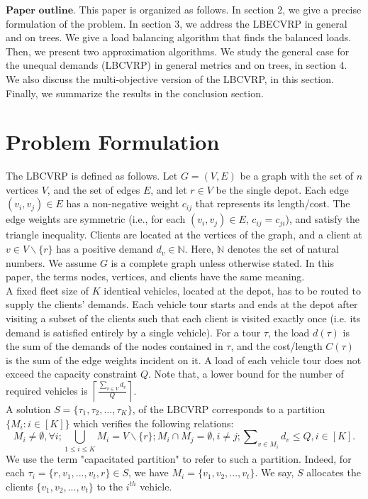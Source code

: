 \indent $\mathbf{Paper\,\,outline}.$ This paper is organized as follows. In section 2, we give a precise formulation of the problem. In section 3, we address the LBECVRP in general and on trees. We give a load balancing algorithm that finds the balanced loads. Then, we present two approximation algorithms. We study the general case for the unequal demands (LBCVRP) in general metrics and on trees, in section 4. We also discuss the multi-objective version of the LBCVRP, in this section. Finally, we summarize the results in the conclusion section.
\section{Problem Formulation}
\indent The LBCVRP is defined as follows. Let $G=(V,E)$ be a graph with the set of $n$ vertices $V$, and the set of edges $E$, and let $r \in V$ be the single depot. Each edge $(v_i,v_j) \in E$ has a non-negative weight $c_{ij}$ that represents its length/cost. The edge weights are symmetric (i.e., for each $(v_i,v_j) \in E$, $c_{ij}=c_{ji}$), and satisfy the triangle inequality. Clients are located at the vertices of the graph, and a client at $v \in V \backslash \{ r\} $ has a positive demand $d_v \in \mathbb{N}$. Here, $\mathbb{N}$ denotes the set of natural numbers. We assume $G$ is a complete graph unless otherwise stated. In this paper, the terms nodes, vertices, and clients have the same meaning.\\
\indent A fixed fleet size of $K$ identical vehicles, located at the depot, has to be routed to supply the clients' demands. Each vehicle tour starts and ends at the depot after visiting a subset of the clients such that each client is visited exactly once (i.e. its demand is satisfied entirely by a single vehicle). For a tour $\tau$, the load $d(\tau)$ is the sum of the demands of the nodes contained in $\tau$, and the cost/length $C(\tau )$ is the sum of the edge weights incident on it. A load of each vehicle tour does not exceed the capacity constraint $Q$. Note that, a lower bound for the number of required vehicles is $\left\lceil \frac{\sum\nolimits_{v \in V}d_v}{Q} \right\rceil$.\\
\indent A solution $S=\{\tau_1,\tau_2,...,\tau_K\}$, of the LBCVRP corresponds to a partition $\{ {M_i}:i \in [K]\}$ which verifies the following relations:
$$M_i \ne \emptyset, \forall i; \bigcup_{1 \le i \le K} M_i= V\backslash\{r\}; M_i \cap M_j= \emptyset,  i\ne j; \sum\nolimits_{v \in M_i} {d_v} \le Q, i \in [K].$$
\noindent We use the term "capacitated partition" to refer to such a partition. Indeed, for each $\tau_i=\{r,v_1,...,v_t,r\}\in S$, we have $M_i=\{v_1,v_2,...,v_t\}$. We say, $S$ allocates the clients $\{v_1,v_2,...,v_t\}$ to the $i^{th}$ vehicle.\\

